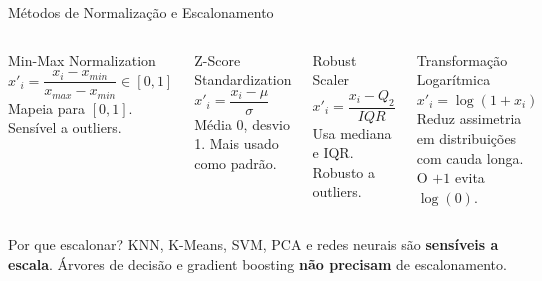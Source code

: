 \documentclass[aspectratio=169]{beamer}
\begin{document}
\begin{frame}{Métodos de Normalização e Escalonamento}
    \begin{columns}[T]
        \begin{exampleblock}{Min-Max Normalization}
            $x'_i = \dfrac{x_i - x_{min}}{x_{max} - x_{min}} \in [0,1]$\\[0.3em]
            \footnotesize Mapeia para $[0,1]$. Sensível a outliers.
        \end{exampleblock}
        \vspace{0.4em}
        \begin{exampleblock}{Z-Score Standardization}
            $x'_i = \dfrac{x_i - \mu}{\sigma}$\\[0.3em]
            \footnotesize Média 0, desvio 1. Mais usado como padrão.
        \end{exampleblock}

        \begin{exampleblock}{Robust Scaler}
            $x'_i = \dfrac{x_i - Q_2}{IQR}$\\[0.3em]
            \footnotesize Usa mediana e IQR. Robusto a outliers.
        \end{exampleblock}
        \vspace{0.4em}
        \begin{exampleblock}{Transformação Logarítmica}
            $x'_i = \log(1 + x_i)$\\[0.3em]
            \footnotesize Reduz assimetria em distribuições com cauda longa. O $+1$ evita $\log(0)$.
        \end{exampleblock}
    \end{columns}

    \vspace{0.4em}
    \begin{alertblock}{Por que escalonar?}
        \small KNN, K-Means, SVM, PCA e redes neurais são \textbf{sensíveis a escala}. Árvores de decisão e gradient boosting \textbf{não precisam} de escalonamento.
    \end{alertblock}
\end{frame}
\end{document}
